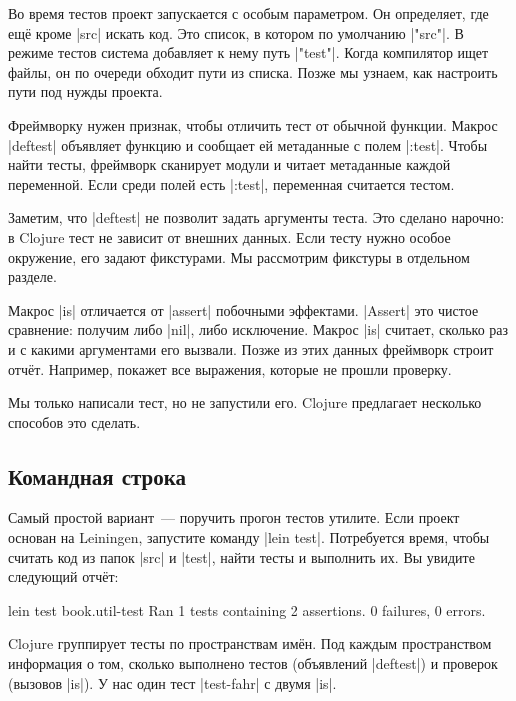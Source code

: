 Во время тестов проект запускается с особым параметром. Он определяет, где ещё
кроме \spverb|src| искать код. Это список, в котором по умолчанию
\spverb|"src"|. В режиме тестов система добавляет к нему путь
\spverb|"test"|. Когда компилятор ищет файлы, он по очереди обходит пути из
списка. Позже мы узнаем, как настроить пути под нужды проекта.


Фреймворку нужен признак, чтобы отличить тест от обычной функции. Макрос
\spverb|deftest| объявляет функцию и сообщает ей метаданные с полем
\spverb|:test|. Чтобы найти тесты, фреймворк сканирует модули и читает
метаданные каждой переменной. Если среди полей есть \spverb|:test|, переменная
считается тестом.

Заметим, что \spverb|deftest| не позволит задать аргументы теста. Это сделано
нарочно: в Clojure тест не зависит от внешних данных. Если тесту нужно особое
окружение, его задают фикстурами. Мы рассмотрим фикстуры в отдельном разделе.

Макрос \spverb|is| отличается от \spverb|assert| побочными
эффектами. \spverb|Assert| это чистое сравнение: получим либо \spverb|nil|, либо
исключение. Макрос \spverb|is| считает, сколько раз и с какими аргументами его
вызвали. Позже из этих данных фреймворк строит отчёт. Например, покажет все
выражения, которые не прошли проверку.

Мы только написали тест, но не запустили его. Clojure предлагает несколько
способов это сделать.

\subsection{Командная строка}


Самый простой вариант~--- поручить прогон тестов утилите. Если проект основан на
Leiningen, запустите команду \spverb|lein test|.
Потребуется время, чтобы считать код из папок \spverb|src| и \spverb|test|,
найти тесты и выполнить их. Вы увидите следующий отчёт:

\begin{english}
  \begin{text}
lein test book.util-test
Ran 1 tests containing 2 assertions.
0 failures, 0 errors.
  \end{text}
\end{english}

Clojure группирует тесты по пространствам имён. Под каждым пространством
информация о том, сколько выполнено тестов (объявлений \spverb|deftest|) и
проверок (вызовов \spverb|is|). У нас один тест \spverb|test-fahr| с двумя
\spverb|is|.

